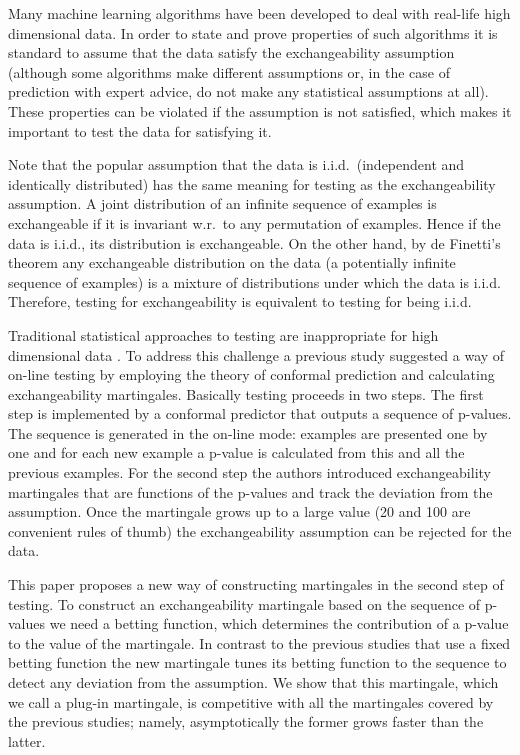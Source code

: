 \documentclass{article}
\theoremstyle{definition}
\begin{document}
Many machine learning algorithms have been developed
to deal with real-life high dimensional data.
In order to state and prove properties of such algorithms it is
standard to assume that the data satisfy the exchangeability assumption
(although some algorithms make different assumptions or,
in the case of prediction with expert advice,
do not make any statistical assumptions at all).
These properties can be violated if the assumption is not satisfied,
which makes it important to test the data for satisfying it.

Note that the popular assumption that the data is i.i.d.\ (independent and identically distributed)
has the same meaning for testing as the exchangeability assumption.
A joint distribution of an infinite sequence of examples is exchangeable
if it is invariant w.r.\ to any permutation of examples.
Hence if the data is i.i.d., its distribution is exchangeable.
On the other hand, by de Finetti's theorem \citep[see, e.g.,][p.~28]{schervish:1995}
any exchangeable distribution on the data
(a potentially infinite sequence of examples)
is a mixture of distributions under which the data is i.i.d.
Therefore, testing for exchangeability is equivalent to testing for being i.i.d.

Traditional statistical approaches to testing are inappropriate
for high dimensional data \citep[see, e.g.,][pp.~6--7]{vapnik:1998}.
To address this challenge a previous study \citep{vovk/nouretdinov/gammerman:2003}
suggested a way of on-line testing by employing the theory of conformal prediction
and calculating exchangeability martingales.
Basically testing proceeds in two steps.
The first step is implemented by a conformal predictor that outputs a sequence of p-values.
The sequence is generated in the on-line mode:
examples are presented one by one and for each new example a p-value is calculated
from this and all the previous examples.
For the second step the authors introduced exchangeability martingales that are functions of the p-values
and track the deviation from the assumption.
Once the martingale grows up to a large value
(20 and 100 are convenient rules of thumb)
the exchangeability assumption can be rejected for the data.

This paper proposes a new way of constructing martingales in the second step of testing.
To construct an exchangeability martingale based on the sequence of p-values we need a betting function,
which determines the contribution of a p-value to the value of the martingale.
In contrast to the previous studies that use a fixed betting function
the new martingale tunes its betting function to the sequence
to detect any deviation from the assumption.
We show that this martingale,
which we call a plug-in martingale,
is competitive with all the martingales covered by the previous studies;
namely, asymptotically the former grows faster than the latter.
\end{document}
